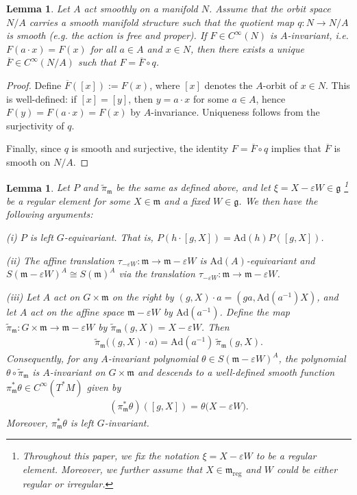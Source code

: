 \documentclass[11pt]{amsart}
\newtheorem{lemma}[theorem]{Lemma}
\theoremstyle{definition}
\theoremstyle{plain}
\theoremstyle{conclusion}
\begin{document}
 \begin{lemma}\label{lem:descent}
Let $A$ act smoothly on a manifold $N$. Assume that the orbit space $N/A$ carries a smooth manifold structure such that the quotient map $q:N\to N/A$ is smooth (e.g. the action is free and proper). If $F\in C^{\infty}(N)$ is $A$-invariant, i.e. $F(a\cdot x)=F(x)$ for all $a\in A$ and $x\in N$, then there exists a unique $\overline{F}\in C^{\infty}(N/A)$ such that $F=\overline{F}\circ q$.
\end{lemma}
\begin{proof}
Define $\overline{F}([x]):=F(x)$, where $[x]$ denotes the $A$-orbit of $x\in N$. This is well-defined: if $[x]=[y]$, then $y=a\cdot x$ for some $a\in A$, hence $F(y)=F(a\cdot x)=F(x)$ by $A$-invariance. Uniqueness follows from the surjectivity of $q$.

Finally, since $q$ is smooth and surjective, the identity $F=\overline{F}\circ q$ implies that $\overline{F}$ is smooth on $N/A$.
\end{proof}


\begin{lemma}
\label{lem:property}
    Let $P$ and $\widetilde\pi_{\mathfrak{m}}$ be the same as defined above, and let $\xi = X  - \varepsilon W \in\mathfrak{g}$ \footnote{Throughout this paper, we fix the notation $\xi = X - \varepsilon W$ to be a regular element. Moreover, we further assume that $X \in \mathfrak{m}_{\mathrm{reg}}$ and $W$ could be either regular or irregular.} be a regular element for some $X \in \mathfrak{m}$ and a fixed $W \in \mathfrak{g}$. We then have the following arguments: 
    
\textup{(i)} $P$ is left $G$-equivariant. That is, $P(h\cdot[g,X]) = \mathrm{Ad}(h)P([g,X])$.
    
\textup{(ii)} The affine translation $\tau_{-\varepsilon W}:\mathfrak{m}\to\mathfrak{m}-\varepsilon W$ is $\mathrm{Ad}(A)$-equivariant and $S(\mathfrak{m}-\varepsilon W)^A\cong S(\mathfrak{m})^A$ via the translation $\tau_{-\varepsilon W}: \mathfrak{m} \rightarrow \mathfrak{m} -\varepsilon W$. 

\textup{(iii)} Let $A$ act on $G\times\mathfrak{m}$ on the right by $(g,X) \cdot a=(ga,\mathrm{Ad}(a^{-1})X)$, and let $A$ act on the affine space $\mathfrak{m}-\varepsilon W$ by $\mathrm{Ad}(a^{-1})$.
Define the map $\widetilde{\pi}_{\mathfrak{m}}:G\times\mathfrak{m}\to\mathfrak{m}-\varepsilon W$ by $\widetilde{\pi}_{\mathfrak{m}}(g,X)=X-\varepsilon W$. Then \begin{align*}
    \widetilde{\pi}_{\mathfrak{m}}\big((g,X)\cdot a\big)=\mathrm{Ad}(a^{-1})\,\widetilde{\pi}_{\mathfrak{m}}(g,X) .
\end{align*} Consequently, for any $A$-invariant polynomial $\theta\in S(\mathfrak{m}-\varepsilon W)^A$, the polynomial $\theta\circ\widetilde{\pi}_{\mathfrak{m}}$ is $A$-invariant on $G\times\mathfrak{m}$ and descends to a well-defined smooth function $\pi_\mathfrak{m}^*\theta\in C^\infty(T^*M)$ given by \begin{align*}
   (\pi_\mathfrak{m}^*\theta)([g,X])=\theta\bigl(X-\varepsilon W\bigr). 
\end{align*} Moreover, $\pi_\mathfrak{m}^*\theta$ is left $G$-invariant.
\end{lemma}
\end{document}
